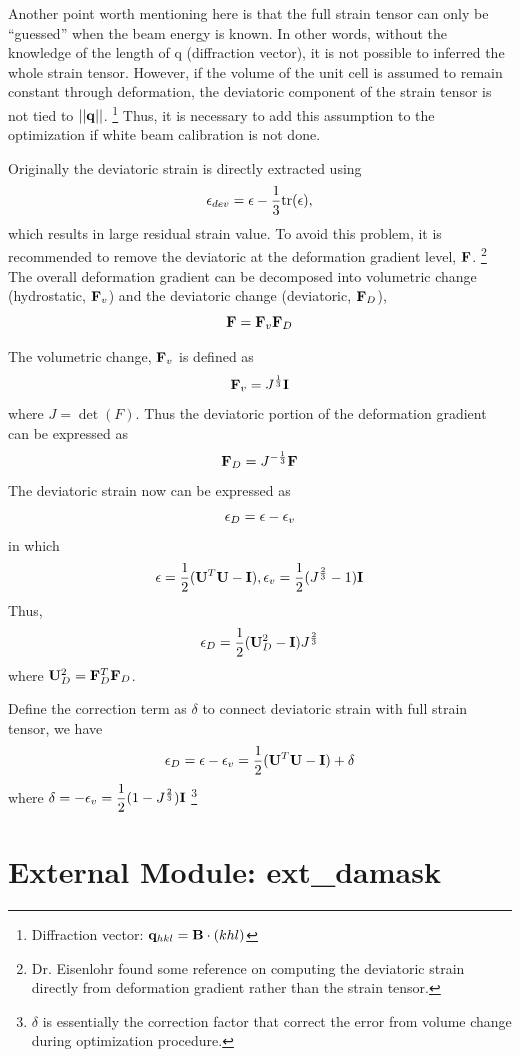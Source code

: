 \documentclass[12pt]{scrartcl}
\begin{document}
\begin{enumerate}
Another point worth mentioning here is that the full strain tensor can only be ``guessed'' when the beam energy is known.
In other words, without the knowledge of the length of \tnsr q (diffraction vector), it is not possible to inferred the whole strain tensor.
However, if the volume of the unit cell is assumed to remain constant through deformation, the deviatoric component of the strain tensor is not tied to $||\mathbf{q}||$.
\footnote{Diffraction vector: $\mathbf{q}_{hkl} = \mathbf{B} \cdot (khl) $}
Thus, it is necessary to add this assumption to the optimization if white beam calibration is not done.

Originally the deviatoric strain is directly extracted using 
\[
	\mathbf{\epsilon}_{dev} = \mathbf{\epsilon} - \dfrac{1}{3}\text{tr}(\mathbf{\epsilon}),
\]
which results in large residual strain value. 
To avoid this problem, it is recommended to remove the deviatoric at the deformation gradient level, $\mathbf{F}$.
\footnote{%
Dr. Eisenlohr found some reference on computing the deviatoric strain directly from deformation gradient rather than the strain tensor.
}
The overall deformation gradient can be decomposed into volumetric change (hydrostatic, $\mathbf{F}_v$) and the deviatoric change (deviatoric, $\mathbf{F}_D$),
\[ 
	\mathbf{F} = \mathbf{F}_v \mathbf{F}_D
\]

The volumetric change, $\mathbf{F}_v$ is defined as 
\[
	\mathbf{F}_v = J^{\frac{1}{3}} \mathbf{I}
\]
where $J = \det (F)$.
Thus the deviatoric portion of the deformation gradient can be expressed as 
\[
	\mathbf{F}_D = J^{-\frac{1}{3}} \mathbf{F}
\]
The deviatoric strain now can be expressed as 
\[
	\mathbf{\epsilon}_D = \mathbf{\epsilon} - \mathbf{\epsilon}_v
\]
in which 
\[
	\mathbf{\epsilon} = \dfrac{1}{2} (\mathbf{U}^T\mathbf{U} - \mathbf{I}), 
	\mathbf{\epsilon}_v = \dfrac{1}{2} (J^{\frac{2}{3}} - 1)\mathbf{I}
\]
Thus,
\[
	\mathbf{\epsilon}_D = \dfrac{1}{2} ( \mathbf{U}_D^2- \mathbf{I}) J^{\frac{2}{3}}
\]
where $\mathbf{U}_D^2 = \mathbf{F}_D^T \mathbf{F}_D$.

Define the correction term as $\delta$ to connect deviatoric strain with full strain tensor, we have
\[
	\mathbf{\epsilon}_D = \mathbf{\epsilon} - \mathbf{\epsilon}_v 
	                          = \dfrac{1}{2} (\mathbf{U}^T\mathbf{U} - \mathbf{I}) + \delta
\]
where $\delta = -\epsilon_v = \dfrac{1}{2} (1 - J^{\frac{2}{3}})\mathbf{I}$
\footnote{%
$\delta$ is essentially the correction factor that correct the error from volume change during optimization procedure.
}

\end{enumerate}


\section{External Module: ext\_damask}
\end{document}
